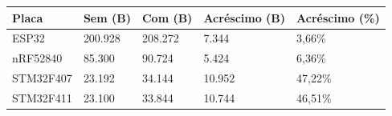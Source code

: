 \begin{tabular}{lllll}
\hline
Placa & Sem (B) & Com (B) & Acréscimo (B) & Acréscimo (\%) \\
\hline
ESP32 & 200.928 & 208.272 & 7.344 & 3,66\% \\
nRF52840 & 85.300 & 90.724 & 5.424 & 6,36\% \\
STM32F407 & 23.192 & 34.144 & 10.952 & 47,22\% \\
STM32F411 & 23.100 & 33.844 & 10.744 & 46,51\% \\
\hline
\end{tabular}
